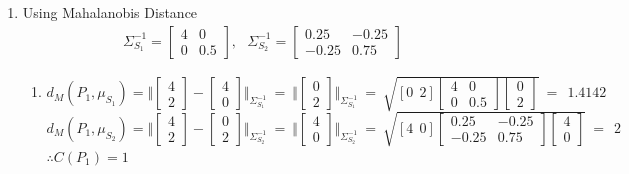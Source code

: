 \documentclass[letterpaper]{article}
\begin{document}
\begin{enumerate}
\item[(b)] Using Mahalanobis Distance
\begin{align}
	\Sigma^{-1}_{S_1} = \begin{bmatrix}
		4 & 0 \\ 0 & 0.5
	\end{bmatrix},~~~ \Sigma^{-1}_{S_2} = \begin{bmatrix}
	0.25 & -0.25 \\ -0.25 & 0.75
	\end{bmatrix}
	\nonumber
\end{align}
\begin{enumerate}
	\item[(i)] $ d_{M}(P_1 , \mu_{S_1}) = \Vert \begin{bmatrix} 4 \\ 2\end{bmatrix} - \begin{bmatrix} 4 \\ 0\end{bmatrix} \Vert_{\Sigma^{-1}_{S_1}} ~=~ \Vert \begin{bmatrix} 0 \\ 2\end{bmatrix} \Vert_{\Sigma^{-1}_{S_1}} ~=
	~ \sqrt{[0 ~~ 2] \begin{bmatrix}4 & 0 \\ 0 & 0.5\end{bmatrix} \begin{bmatrix}0 \\ 2 \end{bmatrix}} ~=~~1.4142$	\\ \vskip 1mm	
	$ d_{M}(P_1 , \mu_{S_2}) = \Vert \begin{bmatrix} 4 \\ 2\end{bmatrix} - \begin{bmatrix} 0 \\ 2\end{bmatrix} \Vert_{\Sigma^{-1}_{S_2}} ~=~ \Vert \begin{bmatrix} 4 \\ 0\end{bmatrix} \Vert_{\Sigma^{-1}_{S_2}} ~=
	~ \sqrt{[4 ~~ 0] \begin{bmatrix}0.25 & -0.25 \\ -0.25 & 0.75\end{bmatrix} \begin{bmatrix}4 \\ 0 \end{bmatrix}} ~=~~ 2$	\\ \vskip 1mm
	$\therefore C(P_1) = 1$
	

\end{enumerate}
\end{enumerate}
\end{document}
